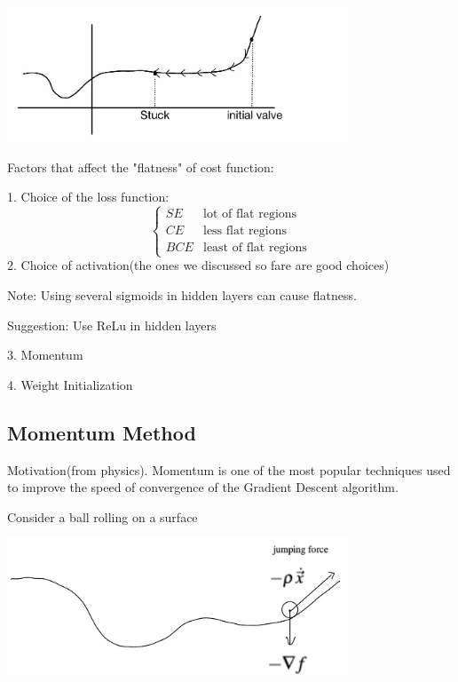 \begin{center}
\includegraphics[width=4in]{images/Chapter 10/10.5(1).png}

\end{center}

\begin{remark}
Factors that affect the "flatness" of cost function:
\item 1. Choice of the loss function: $$
\begin{cases}
        SE & \text {lot of flat regions} \\
        CE & \text {less flat regions} \\
        BCE & \text {least of flat regions}
        \end{cases}
$$
2. Choice of activation(the ones we discussed so fare are good choices)

Note: Using several sigmoids in hidden layers can cause flatness.

Suggestion: Use ReLu in hidden layers

3. Momentum

4. Weight Initialization

\end{remark}


\subsection{Momentum Method}
Motivation(from physics). Momentum is one of the most popular techniques used to improve the speed of convergence of the Gradient Descent algorithm.

Consider a ball rolling on a surface

\begin{center}
\includegraphics[width=4in]{images/Chapter 10/10.5(2).png}

\end{center}


